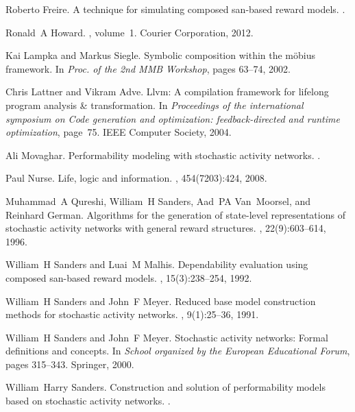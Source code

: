 \documentclass[11pt]{article}
\begin{document}
\begin{thebibliography}{10}
Roberto Freire.
\newblock A technique for simulating composed san-based reward models.
.

Ronald~A Howard.
, volume~1.
\newblock Courier Corporation, 2012.

Kai Lampka and Markus Siegle.
\newblock Symbolic composition within the m{\"o}bius framework.
\newblock In {\em Proc. of the 2nd MMB Workshop}, pages 63--74, 2002.

Chris Lattner and Vikram Adve.
\newblock Llvm: A compilation framework for lifelong program analysis \&
  transformation.
\newblock In {\em Proceedings of the international symposium on Code generation
  and optimization: feedback-directed and runtime optimization}, page~75. IEEE
  Computer Society, 2004.

Ali Movaghar.
\newblock Performability modeling with stochastic activity networks.
.

Paul Nurse.
\newblock Life, logic and information.
, 454(7203):424, 2008.

Muhammad~A Qureshi, William~H Sanders, Aad~PA Van~Moorsel, and Reinhard German.
\newblock Algorithms for the generation of state-level representations of
  stochastic activity networks with general reward structures.
, 22(9):603--614,
  1996.

William~H Sanders and Luai~M Malhis.
\newblock Dependability evaluation using composed san-based reward models.
, 15(3):238--254,
  1992.

William~H Sanders and John~F Meyer.
\newblock Reduced base model construction methods for stochastic activity
  networks.
, 9(1):25--36,
  1991.

William~H Sanders and John~F Meyer.
\newblock Stochastic activity networks: Formal definitions and concepts.
\newblock In {\em School organized by the European Educational Forum}, pages
  315--343. Springer, 2000.

William~Harry Sanders.
\newblock Construction and solution of performability models based on
  stochastic activity networks.
.

\end{thebibliography}
\end{document}
